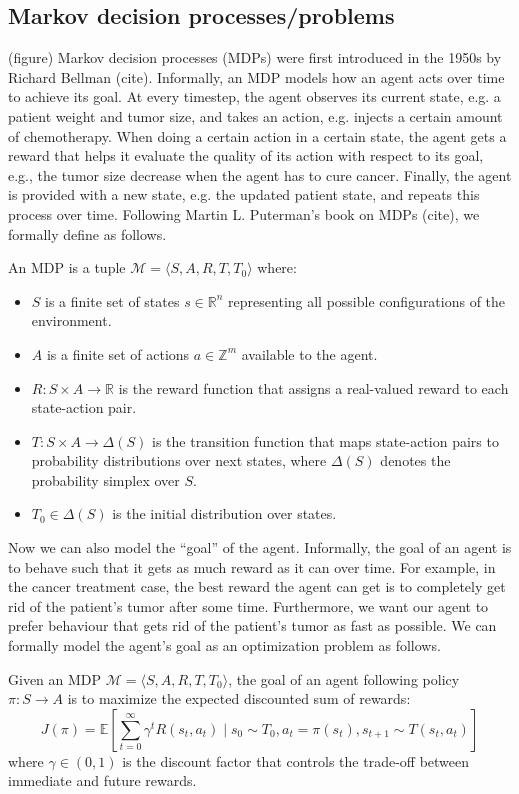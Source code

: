 \subsection{Markov decision processes/problems}
(figure)
Markov decision processes (MDPs) were first introduced in the 1950s by Richard Bellman (cite). Informally, an MDP models how an agent acts over time to achieve its goal. At every timestep, the agent observes its current state, e.g. a patient weight and tumor size, and takes an action, e.g. injects a certain amount of chemotherapy. When doing a certain action in a certain state, the agent gets a reward that helps it evaluate the quality of its action with respect to its goal, e.g., the tumor size decrease when the agent has to cure cancer. Finally, the agent is provided with a new state, e.g. the updated patient state, and repeats this process over time. Following Martin L. Puterman's book on MDPs (cite), we formally define as follows.
\begin{definition} An MDP is a tuple $\mathcal{M} = \langle S, A, R, T, T_0 \rangle$ where:
\begin{itemize}
\item $S$ is a finite set of states $s \in \mathbb{R}^n$ representing all possible configurations of the environment.
\item $A$ is a finite set of actions $a \in \mathbb{Z}^m$ available to the agent.
\item $R: S \times A \rightarrow \mathbb{R}$ is the reward function that assigns a real-valued reward to each state-action pair.
\item $T: S \times A \rightarrow \Delta(S)$ is the transition function that maps state-action pairs to probability distributions over next states, where $\Delta(S)$ denotes the probability simplex over $S$.
\item $T_0 \in \Delta(S)$ is the initial distribution over states.
\end{itemize}
\end{definition}
Now we can also model the ``goal'' of the agent. Informally, the goal of an agent is to behave such that it gets as much reward as it can over time. For example, in the cancer treatment case, the best reward the agent can get is to completely get rid of the patient's tumor after some time. Furthermore, we want our agent to prefer behaviour that gets rid of the patient's tumor as fast as possible. We can formally model the agent's goal as an optimization problem as follows. %
\begin{definition} Given an MDP $\mathcal{M}=\langle S, A, R, T, T_0 \rangle$, the goal of an agent following policy $\pi: S \rightarrow A$ is to maximize the expected discounted sum of rewards:
$$J(\pi) = \mathbb{E}\left[\sum_{t=0}^{\infty} \gamma^t R(s_t, a_t) \mid s_0 \sim T_0, a_t = \pi(s_t), s_{t+1} \sim T(s_t, a_t)\right]$$
where $\gamma \in (0,1)$ is the discount factor that controls the trade-off between immediate and future rewards.
\end{definition}

